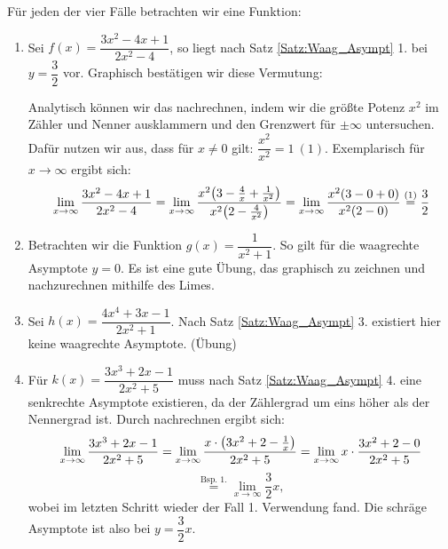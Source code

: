 \documentclass[ngerman, 12pt]{nssheetxea}
\begin{document}
\begin{example} Für jeden der vier Fälle betrachten wir eine Funktion:

\begin{enumerate}
\item Sei $f(x)=\dfrac{3x^2-4x+1}{2x^2-4}$, so liegt nach Satz \ref{Satz:Waag_Asympt} 1. bei $y=\dfrac{3}{2}$ vor. Graphisch bestätigen wir diese Vermutung:
\begin{center}
\end{center}
Analytisch können wir das nachrechnen, indem wir die größte Potenz $x^2$ im Zähler und Nenner ausklammern und den Grenzwert für $\pm \infty$ untersuchen. Dafür nutzen wir aus, dass für $x\neq 0$ gilt: $\dfrac{x^2}{x^2}=1 \ (1)$. Exemplarisch für $x\to \infty$ ergibt sich:
\[ \lim_{x\to \infty} \dfrac{3x^2-4x+1}{2x^2-4} = \lim_{x\to \infty} \dfrac{x^2 \mleft( 3-\frac{4}{x}+\frac{1}{x^2}    \mright)}{x^2 \mleft( 2-\frac{4}{x^2} \mright)} =  \lim_{x\to \infty} \dfrac{x^2 \mleft( 3-0+0 \mright)}{x^2 \mleft( 2-0 \mright)} \stackrel{(1)}{=} \dfrac{3}{2} \]
\item Betrachten wir die Funktion $g(x)=\dfrac{1}{x^2+1}$. So gilt für die waagrechte Asymptote $y=0$. Es ist eine gute Übung, das graphisch zu zeichnen und nachzurechnen mithilfe des Limes.
\item Sei $h(x)=\dfrac{4x^4+3x-1}{2x^2+1}$. Nach Satz \ref{Satz:Waag_Asympt} 3. existiert hier keine waagrechte Asymptote. (Übung)
\item Für $k(x)=\dfrac{3x^3+2x-1}{2x^2+5}$ muss nach Satz \ref{Satz:Waag_Asympt} 4. eine senkrechte Asymptote existieren, da der Zählergrad um eins höher als der Nennergrad ist. Durch nachrechnen ergibt sich:
\[ \lim_{x\to \infty} \dfrac{3x^3+2x-1}{2x^2+5} = \lim_{x\to \infty} \dfrac{x \cdot \mleft(3 x^2+2-\frac{1}{x}\mright)}{2x^2+5} = \lim_{x\to \infty} x \cdot \dfrac{3x^2+2-0}{2x^2+5}  \]
\[ \stackrel{\text{Bsp. 1.}}{=} \lim_{x\to \infty} \frac{3}{2}x, \]
wobei im letzten Schritt wieder der Fall 1. Verwendung fand. Die schräge Asymptote ist also bei $y=\dfrac{3}{2}x$.
\end{enumerate}



\end{example}
\end{document}
